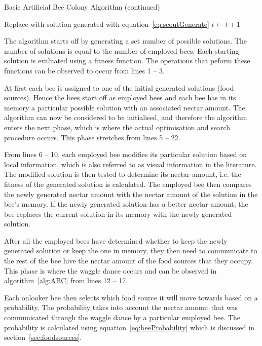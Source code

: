 \begin{algorithm}
	\caption{Basic Artificial Bee Colony Algorithm (continued)}
	\label{alg:ABC1}
	\begin{algorithmic}[1]
				\State Replace with solution generated with equation~\ref{eq:scoutGenerate}
			\EndIf
			\State$t \leftarrow t + 1$
		\EndWhile
	\end{algorithmic}
\end{algorithm}
The algorithm starts off by generating a set number of possible solutions. The number of solutions is equal to the number of employed bees. Each starting solution is evaluated using a fitness function. The operations that peform these functions can be observed to occur from lines 1 -- 3.

At first each bee is assigned to one of the initial generated solutions (food sources). Hence the bees start off as employed bees and each bee has in its memory a particular possible solution with an associated nectar amount. The algorithm can now be considered to be initialised, and therefore the algorithm enters the next phase, which is where the actual optimisation and search procedure occurs. This phase stretches from lines 5 -- 22.

From lines 6 -- 10, each employed bee modifies its particular solution based on local information, which is also referred to as visual information in the literature. The modified solution is then tested to determine its nectar amount, i.e. the fitness of the generated solution is calculated. The employed bee then compares the newly generated nectar amount with the nectar amount of the solution in the bee's memory. If the newly generated solution has a better nectar amount, the bee replaces the current solution in its memory with the newly generated solution.

After all the employed bees have determined whether to keep the newly generated solution or keep the one in memory, they then need to communicate to the rest of the bee hive the nectar amount of the food sources that they occupy. This phase is where the waggle dance occurs and can be observed in algorithm~\ref{alg:ABC} from lines 12 -- 17.

Each onlooker bee then selects which food source it will move towards based on a probability. The probability takes into account the nectar amount that was communicated through the waggle dance by a particular employed bee. The probability is calculated using equation~\ref{eq:beeProbability} which is discussed in section~\ref{sec:foodsources}.

